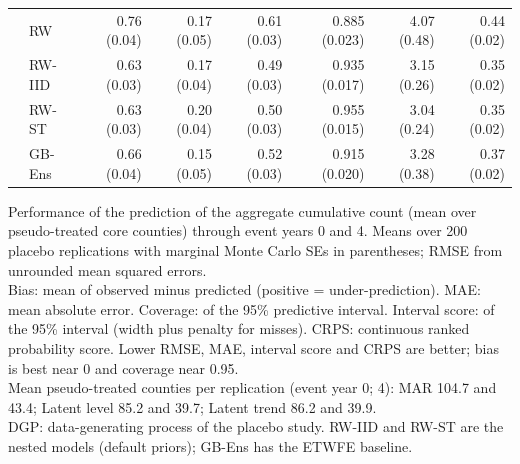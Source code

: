 \begin{table}
\begin{tabular*}{1\linewidth}{@{\extracolsep{\fill}}llrrrrrr}
 & RW & 0.76 (0.04) & 0.17 (0.05) & 0.61 (0.03) & 0.885 (0.023) & 4.07 (0.48) & 0.44 (0.02) \\ 
 & RW-IID & 0.63 (0.03) & 0.17 (0.04) & 0.49 (0.03) & 0.935 (0.017) & 3.15 (0.26) & 0.35 (0.02) \\ 
 & RW-ST & 0.63 (0.03) & 0.20 (0.04) & 0.50 (0.03) & 0.955 (0.015) & 3.04 (0.24) & 0.35 (0.02) \\ 
 & GB-Ens & 0.66 (0.04) & 0.15 (0.05) & 0.52 (0.03) & 0.915 (0.020) & 3.28 (0.38) & 0.37 (0.02) \\ 
\bottomrule
\end{tabular*}
\begin{minipage}{\linewidth}
\vspace{.05em}
Performance of the prediction of the aggregate cumulative count (mean over pseudo-treated core counties) through event years 0 and 4. Means over 200 placebo replications with marginal Monte Carlo SEs in parentheses; RMSE from unrounded mean squared errors.\\
Bias: mean of observed minus predicted (positive = under-prediction). MAE: mean absolute error. Coverage: of the 95\% predictive interval. Interval score: of the 95\% interval (width plus penalty for misses). CRPS: continuous ranked probability score. Lower RMSE, MAE, interval score and CRPS are better; bias is best near 0 and coverage near 0.95.\\
Mean pseudo-treated counties per replication (event year 0; 4): MAR 104.7 and 43.4; Latent level 85.2 and 39.7; Latent trend 86.2 and 39.9.\\
DGP: data-generating process of the placebo study. RW-IID and RW-ST are the nested models (default priors); GB-Ens has the ETWFE baseline.\\
\end{minipage}
\end{table}

